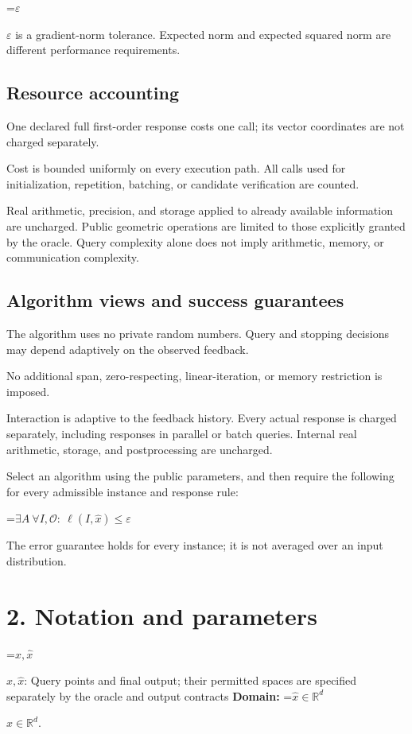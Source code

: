 \documentclass[10pt,a4paper]{article}
\newcommand{\AtlasMath}[1]{\par\begingroup\centering\setbox0=\hbox{$\displaystyle #1$}\ifdim\wd0>1.4\linewidth\typeout{ATLAS WIDE FORMULA: \the\wd0}\fi\ifdim\wd0>\linewidth\resizebox{\linewidth}{!}{\box0}\else\box0\fi\par\endgroup}
\newcommand{\AtlasInlineMath}[1]{\begingroup\setbox0=\hbox{$#1$}\ifdim\wd0>.4\linewidth\endgroup\AtlasMath{#1}\else\endgroup$#1$\fi}
\begin{document}
\AtlasInlineMath{\varepsilon} is a gradient-norm tolerance. Expected norm and expected squared norm are different performance requirements.

\subsection{Resource accounting}
One declared full first-order response costs one call; its vector coordinates are not charged separately.

Cost is bounded uniformly on every execution path. All calls used for initialization, repetition, batching, or candidate verification are counted.

Real arithmetic, precision, and storage applied to already available information are uncharged. Public geometric operations are limited to those explicitly granted by the oracle. Query complexity alone does not imply arithmetic, memory, or communication complexity.

\subsection{Algorithm views and success guarantees}
The algorithm uses no private random numbers. Query and stopping decisions may depend adaptively on the observed feedback.

No additional span, zero-respecting, linear-iteration, or memory restriction is imposed.

Interaction is adaptive to the feedback history. Every actual response is charged separately, including responses in parallel or batch queries. Internal real arithmetic, storage, and postprocessing are uncharged.

Select an algorithm using the public parameters, and then require the following for every admissible instance and response rule:


\AtlasMath{\exists A\ \forall I,\mathcal{O}:\ \ell(I,\widehat{x})\le\varepsilon}


The error guarantee holds for every instance; it is not averaged over an input distribution.

\section{2. Notation and parameters}
\AtlasInlineMath{x,\widehat{x}}: Query points and final output; their permitted spaces are specified separately by the oracle and output contracts \textbf{Domain:} \AtlasInlineMath{\widehat{x}\in \mathbb{R}^d}.
\end{document}
